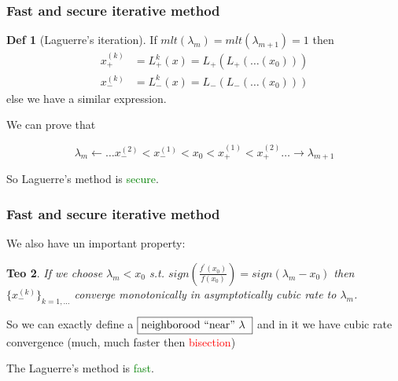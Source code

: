 \documentclass{beamer}
\theoremstyle{definition} \newtheorem{de}{Def}
\theoremstyle{remark} \newtheorem{os}[de]{Oss}
\theoremstyle{plain} \newtheorem{te}[de]{Teo}
\theoremstyle{plain} \newtheorem{co}[de]{Cor}
\theoremstyle{plain} \newtheorem{pr}[de]{Prop}
\theoremstyle{plain} \newtheorem{lem}[de]{Lemm}
\theoremstyle{remark} \newtheorem{rem}[de]{Remark}
\begin{document}
\begin{frame}
\frametitle{Fast and secure iterative method}

\begin{de}[Laguerre's iteration]
  If $mlt(\lambda_m)=mlt(\lambda_{m+1})=1$ then
  \begin{align*}
    x_{+}^{(k)} &= L_{+}^k(x)=L_{+}(L_{+}(\dots(x_{0})))\\
    x_{-}^{(k)} &= L_{-}^k(x)=L_{-}(L_{-}(\dots(x_{0})))
  \end{align*}
  else we have a similar expression.
\end{de} 

\pause

We can prove that

\begin{equation*}
  \lambda_m \leftarrow \dots x_{-}^{(2)} < x_{-}^{(1)} < x_{0} < x_{+}^{(1)} < x_{+}^{(2)} \dots \rightarrow \lambda_{m+1}
\end{equation*}
  
\pause

So Laguerre's method is \textcolor{green}{secure}.

\end{frame}


\begin{frame}
\frametitle{Fast and secure iterative method}

We also have un important property:

\begin{te}
  If we choose $\lambda_m < x_0$ s.t. 
$sign( \frac{f^{'}(x_0)}{f(x_0)} ) = sign(\lambda_m - x_0)$ then 
$\{ x_{-}^{(k)} \}_{k=1,\dots}$ converge monotonically in asymptotically 
cubic rate to $\lambda_m$. 
\end{te}

\pause

So we can exactly define a $\fbox{neighborood ``near'' $\lambda$ }$ and in it we
have cubic rate convergence (much, much faster then \textcolor{red}{bisection}) 

\pause

The Laguerre's method is \textcolor{green}{fast}.

\end{frame}
\end{document}

